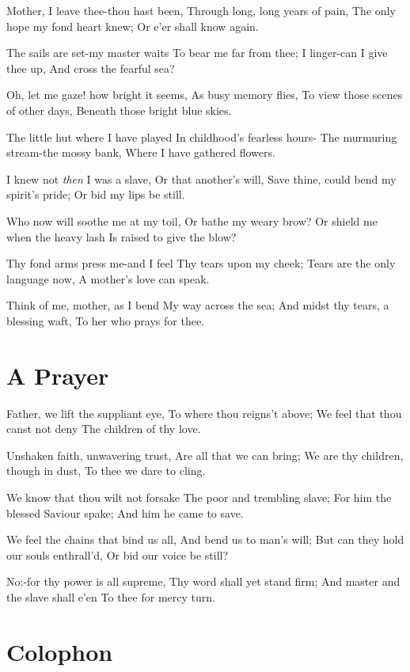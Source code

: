 \documentclass[11pt,a4paper]{article}
\begin{document}
Mother, I leave thee-thou hast been,
Through long, long years of pain,
The only hope my fond heart knew;
Or e'er shall know again.

The sails are set-my master waits
To bear me far from thee;
I linger-can I give thee up,
And cross the fearful sea?

Oh, let me gaze! how bright it seems,
As busy memory flies,
To view those scenes of other days,
Beneath those bright blue skies.

The little hut where I have played
In childhood's fearless hours-
The murmuring stream-the mossy bank,
Where I have gathered flowers.

I knew not \textit{then} I was a slave,
Or that another's will,
Save thine, could bend my spirit's pride;
Or bid my lips be still.

Who now will soothe me at my toil,
Or bathe my weary brow?
Or shield me when the heavy lash
Is raised to give the blow?

Thy fond arms press me-and I feel
Thy tears upon my cheek;
Tears are the only language now,
A mother's love can speak.

Think of me, mother, as I bend
My way across the sea;
And midst thy tears, a blessing waft,
To her who prays for thee.

\section{A Prayer}

Father, we lift the suppliant eye,
To where thou reigns't above;
We feel that thou canst not deny
The children of thy love.

Unshaken faith, unwavering trust,
Are all that we can bring;
We are thy children, though in dust,
To thee we dare to cling.

We know that thou wilt not forsake
The poor and trembling slave;
For him the blessed Saviour spake;
And him he came to save.

We feel the chains that bind us all,
And bend us to man's will;
But can they hold our souls enthrall'd,
Or bid our voice be still?

No:-for thy power is all supreme,
Thy word shall yet stand firm;
And master and the slave shall e'en
To thee for mercy turn.

\section{Colophon}
\end{document}
